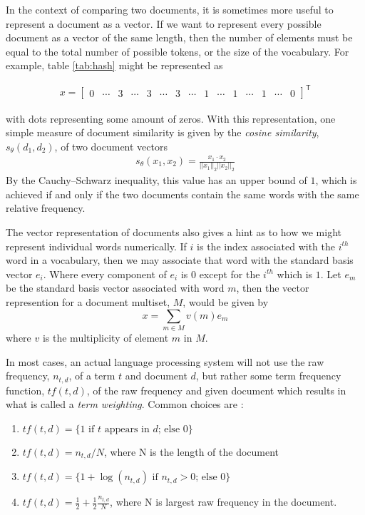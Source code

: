 In the context of comparing two documents, it is sometimes more useful to represent a document as a vector.  If we want to represent every possible document as a vector of the same length, then the number of elements must be equal to the total number of possible tokens, or the size of the vocabulary.  For example, table \ref{tab:hash} might be represented as 
\begin{singlespace}
\begin{align}
x = 
\begin{bmatrix}
0 & \cdots & 3 & \cdots & 3 & \cdots & 3 & \cdots & 1 & \cdots & 1 & \cdots & 1 & \cdots & 0
\end{bmatrix}^\mathsf{T}
\end{align}
\end{singlespace}
\noindent
with dots representing some amount of zeros.  With this representation, one simple measure of document similarity is given by the \textit{cosine similarity}, $s_\theta(d_1,d_2)$, of two document vectors
\begin{align}
s_\theta(x_1,x_2) = \frac{x_1\cdot x_2}{||x_1||_2 ||x_2||_2}
\end{align}
By the Cauchy–Schwarz inequality, this value has an upper bound of $1$, which is achieved if and only if the two documents contain the same words with the same relative frequency.

The vector representation of documents also gives a hint as to how we might represent individual words numerically.  If $i$ is the index associated with the $i^{th}$ word in a vocabulary, then we may associate that word with the standard basis vector $e_i$.  Where every component of $e_i$ is $0$ except for the $i^{th}$ which is $1$.  Let $e_m$ be the standard basis vector associated with word $m$, then the vector represention for a document multiset, $M$, would be given by
\begin{equation}
x = \sum_{m\in M} v(m)e_m
\end{equation}
where $v$ is the multiplicity of element $m$ in $M$.

In most cases, an actual language processing system will not use the raw frequency, $n_{t,d}$, of a term $t$ and document $d$, but rather some term frequency function, $tf(t,d)$, of the raw frequency and given document which results in what is called a \textit{term weighting}.  Common choices are \cite{cm08}:

\begin{enumerate}
\item $tf(t,d) = \{1 \text{ if $t$ appears in $d$; else } 0\}$
\item $tf(t,d) = n_{t,d} / N$, where N is the length of the document
\item $tf(t,d) = \{1 + \log(n_{t,d}) \text{ if $n_{t,d} > 0$; else } 0\}$
\item $tf(t,d) = \frac{1}{2} + \frac{1}{2} \frac{n_{t,d}}{N}$, where N is largest raw frequency in the document.
\end{enumerate}

